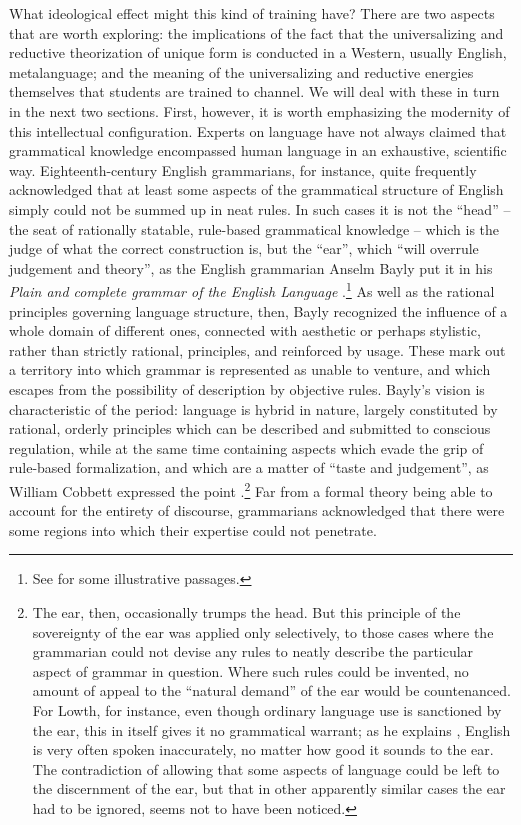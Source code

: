 \documentclass[output=paper]{langscibook}
\begin{document}
What ideological effect might this kind of training have? There are two aspects that are worth exploring: the implications of the fact that the universalizing and reductive theorization of unique form is conducted in a Western, usually English, metalanguage; and the meaning of the universalizing and reductive energies themselves that students are trained to channel. We will deal with these in turn in the next two sections. First, however, it is worth emphasizing the modernity of this intellectual configuration. Experts on language have not always claimed that grammatical knowledge encompassed human language in an exhaustive, scientific way. Eighteenth-century English grammarians, for instance, quite frequently acknowledged that at least some aspects of the grammatical structure of English simply could not be summed up in neat rules. In such cases it is not the ``head'' – the seat of rationally statable, rule-based grammatical knowledge – which is the judge of what the correct construction is, but the ``ear'', which ``will overrule judgement and theory'', as the English grammarian Anselm Bayly put it in his \citeyear{Bayly1772} \emph{Plain and complete grammar of the English Language} \citep[61]{Bayly1772}.\footnote{See \citet[26, 44]{Bayly1772} for some illustrative passages.} As well as the rational principles governing language structure, then, Bayly recognized the influence of a whole domain of different ones, connected with aesthetic or perhaps stylistic, rather than strictly rational, principles, and reinforced by usage. These mark out a territory into which grammar is represented as unable to venture, and which escapes from the possibility of description by objective rules. Bayly's vision is characteristic of the period: language is hybrid in nature, largely constituted by rational, orderly principles which can be described and submitted to conscious regulation, while at the same time containing aspects which evade the grip of rule-based formalization, and which are a matter of ``taste and judgement'', as William Cobbett expressed the point \citep[56]{Cobbett19831818}.\footnote{The ear, then, occasionally trumps the head. But this principle of the sovereignty of the ear was applied only selectively, to those cases where the grammarian could not devise any rules to neatly describe the particular aspect of grammar in question. Where such rules could be invented, no amount of appeal to the ``natural demand'' of the ear would be countenanced. For Lowth, for instance, even though ordinary language use is sanctioned by the ear, this in itself gives it no grammatical warrant; as he explains \citep[9]{Lowth1762}, English is very often spoken inaccurately, no matter how good it sounds to the ear. The contradiction of allowing that some aspects of language could be left to the discernment of the ear, but that in other apparently similar cases the ear had to be ignored, seems not to have been noticed.} Far from a formal theory being able to account for the entirety of discourse, grammarians acknowledged that there were some regions into which their expertise could not penetrate.
\end{document}
